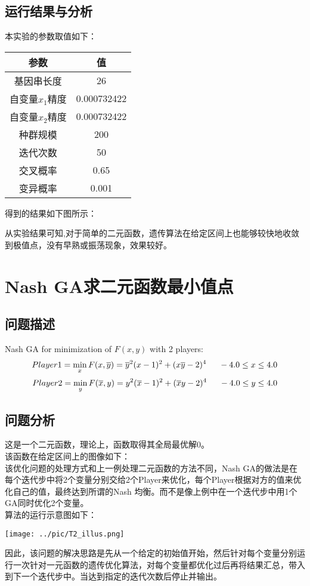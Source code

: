 \documentclass[UTF8]{ctexart}
\begin{document}
\subsection{运行结果与分析}
\indent 本实验的参数取值如下：
\begin{center}
\begin{tabular}{cc}
  \toprule
  参数 & 值 \\
  \midrule
  基因串长度 & 26 \\
  自变量$x_1$精度 & 0.000732422\\
  自变量$x_2$精度 & 0.000732422\\
  种群规模   & 200 \\
  迭代次数   & 50 \\
  交叉概率   & 0.65 \\
  变异概率   & 0.001 \\
  \bottomrule
\end{tabular}
\end{center}
得到的结果如下图所示：
\begin{center}
\end{center}

\indent 从实验结果可知,对于简单的二元函数，遗传算法在给定区间上也能够较快地收敛到极值点，没有早熟或振荡现象，效果较好。

\section{Nash GA求二元函数最小值点}

\subsection{问题描述}
Nash GA for minimization of $F(x,y)$ with 2 players:
\[ Player1=\min_x F(x,\overline{y})={\overline{y}}^2 (x-1)^2+(x \overline{y}-2)^4 \indent -4.0 \leq x \leq 4.0 \\ \]
\[ Player2=\min_y F(\overline{x},y)=y^2 (\overline{x}-1)^2+(\overline{x}y-2)^4 \indent -4.0 \leq y \leq 4.0 \\ \]

\subsection{问题分析}
这是一个二元函数，理论上，函数取得其全局最优解0。\\
\indent 该函数在给定区间上的图像如下：\\

\indent 该优化问题的处理方式和上一例处理二元函数的方法不同，Nash GA的做法是在每个迭代步中将2个变量分别交给2个Player来优化，每个Player根据对方的值来优化自己的值，最终达到所谓的Nash 均衡。而不是像上例中在一个迭代步中用1个GA同时优化2个变量。\\
\indent 算法的运行示意图如下：
\begin{center}
\texttt{[image: ../pic/T2\_illus.png]}
\end{center}
\indent 因此，该问题的解决思路是先从一个给定的初始值开始，然后针对每个变量分别运行一次针对一元函数的遗传优化算法，对每个变量都优化过后再将结果汇总，带入到下一个迭代步中。当达到指定的迭代次数后停止并输出。\\
\end{document}
